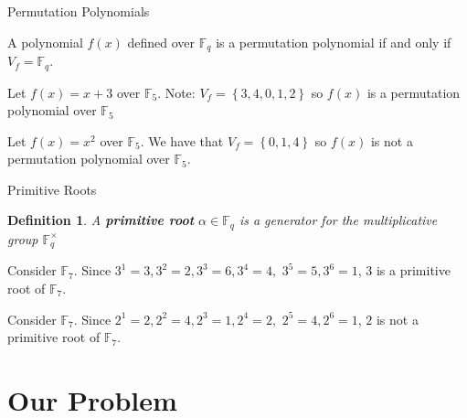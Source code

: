 \documentclass{beamer}
\newtheorem*{definition*}{Definition}
\begin{document}
\begin{frame}{Permutation Polynomials}

\begin{definition}
  A polynomial $f(x)$ defined over $\mathbb{F}_{q}$ is a permutation polynomial if and only if  $V_{f} = \mathbb{F}_{q}$.
\end{definition}

\pause

\begin{example}
  Let $f(x) = x+3$ over $\mathbb{F}_{5}$. Note: $V_{f} = \left\{3, 4, 0, 1, 2 \right\}$ so $f(x)$ is a permutation polynomial over $\mathbb{F}_{5}$
\end{example}

\pause

\begin{example}
Let $f(x) = x^2$ over $\mathbb{F}_{5}$. We have that $V_{f} = \left\{0, 1, 4 \right\}$ so $f(x)$ is not a permutation polynomial over $\mathbb{F}_{5}$.
\end{example}

\end{frame}


\begin{frame}{Primitive Roots}

\begin{definition*}
  A \textbf{primitive root} $\alpha \in \mathbb{F}_q$ is a generator for the multiplicative group $\mathbb{F}_{q}^{\times}$
\end{definition*}

\pause

\begin{example}
  Consider $\mathbb{F}_{7}$. Since $3^1 = 3, 3^2 = 2, 3^3 = 6, 3^4 = 4,$ $ 3^5 = 5, 3^6 = 1$, $3$ is a primitive root of $\mathbb{F}_{7}$.
\end{example}

\pause

\begin{example}
  Consider $\mathbb{F}_{7}$. Since $2^1 = 2, 2^2 = 4, 2^3 = 1, 2^4 = 2,$ $ 2^5 = 4, 2^6 = 1$, $2$ is not a primitive root of $\mathbb{F}_{7}$.
\end{example}

\end{frame}


\section{Our Problem} %
\label{sec:our_problem}
\end{document}
